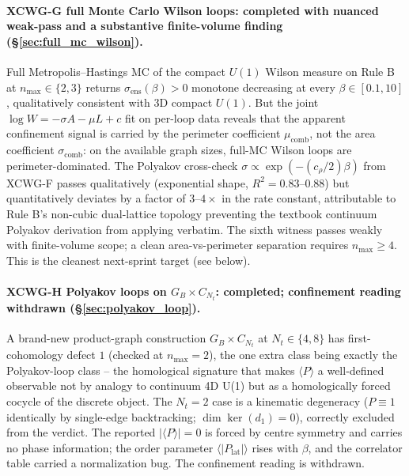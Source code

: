 \documentclass[11pt]{article}
\begin{document}
\paragraph{XCWG-G full Monte Carlo Wilson loops: completed with nuanced
weak-pass and a substantive finite-volume finding
(\S\ref{sec:full_mc_wilson}).} Full Metropolis--Hastings MC of the compact
$U(1)$ Wilson measure on Rule B at $n_\text{max}\in\{2,3\}$ returns
$\sigma_\text{ens}(\beta)>0$ monotone decreasing at every $\beta\in[0.1,10]$,
qualitatively consistent with 3D compact $U(1)$. But the joint
$\log W=-\sigma A-\mu L+c$ fit on per-loop data reveals that the apparent
confinement signal is carried by the perimeter coefficient $\mu_\text{comb}$,
not the area coefficient $\sigma_\text{comb}$: on the available graph
sizes, full-MC Wilson loops are perimeter-dominated. The Polyakov
cross-check $\sigma\propto\exp(-(c_\rho/2)\beta)$ from XCWG-F passes
qualitatively (exponential shape, $R^2=0.83$--$0.88$) but quantitatively
deviates by a factor of $3$--$4\times$ in the rate constant, attributable
to Rule B's non-cubic dual-lattice topology preventing the textbook
continuum Polyakov derivation from applying verbatim. The sixth witness
passes weakly with finite-volume scope; a clean area-vs-perimeter separation
requires $n_\text{max}\ge 4$. This is the cleanest next-sprint target
(see below).

\paragraph{XCWG-H Polyakov loops on $G_B\times C_{N_t}$: completed;
confinement reading withdrawn (\S\ref{sec:polyakov_loop}).} A brand-new product-graph construction
$G_B\times C_{N_t}$ at $N_t\in\{4,8\}$ has first-cohomology defect $1$
(checked at $n_\text{max} = 2$), the one extra class being exactly the
Polyakov-loop class -- the homological
signature that makes $\langle P\rangle$ a well-defined observable not by
analogy to continuum 4D U(1) but as a homologically forced cocycle of the
discrete object. The $N_t=2$ case is a kinematic degeneracy ($P\equiv 1$
identically by single-edge backtracking; $\dim\ker(d_1)=0$), correctly
excluded from the verdict.  The reported $|\langle P\rangle|=0$ is forced
by centre symmetry and carries no phase information; the order parameter
$\langle |P_\text{lat}| \rangle$ rises with $\beta$, and the correlator table
carried a normalization bug.  The confinement reading is withdrawn.
\end{document}
